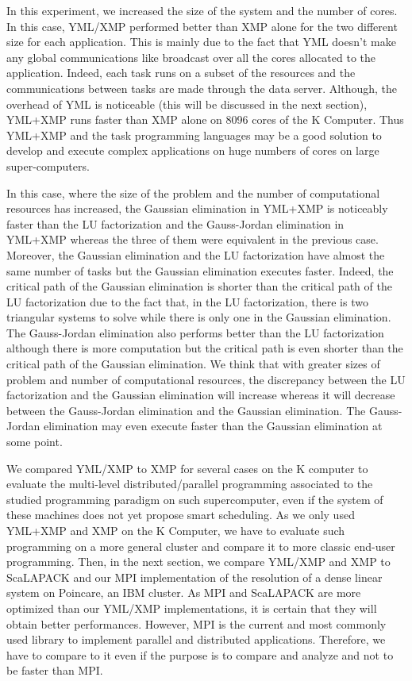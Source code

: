 In this experiment, we increased the size of the system and the number of cores.
In this case, YML/XMP performed better than XMP alone for the two different size for each application.
This is mainly due to the fact that YML doesn't make any global communications like broadcast over all the cores allocated to the application.
Indeed, each task runs on a subset of the resources and the communications between tasks are made through the data server.
Although, the overhead of YML is noticeable (this will be discussed in the next section), YML+XMP runs faster than XMP alone on 8096 cores of the K Computer.
Thus YML+XMP and the task programming languages may be a good solution to develop and execute complex applications on huge numbers of cores on large super-computers.

In this case, where the size of the problem and the number of computational resources has increased, the Gaussian elimination in YML+XMP is noticeably faster than the LU factorization and the Gauss-Jordan elimination in YML+XMP whereas the three of them were equivalent in the previous case.
Moreover, the Gaussian elimination and the LU factorization have almost the same number of tasks but the Gaussian elimination executes faster.
Indeed, the critical path of the Gaussian elimination is shorter than the critical path of the LU factorization due to the fact that, in the LU factorization, there is two triangular systems to solve while there is only one in the Gaussian elimination.
The Gauss-Jordan elimination also performs better than the LU factorization although there is more computation but the critical path is even shorter than the critical path of the Gaussian elimination.
We think that with greater sizes of problem and number of computational resources, the discrepancy between the LU factorization and the Gaussian elimination will increase whereas it will decrease between the Gauss-Jordan elimination and the Gaussian elimination.
The Gauss-Jordan elimination may even execute faster than the Gaussian elimination at some point.


We compared YML/XMP to XMP for several cases on the K computer to evaluate the multi-level distributed/parallel programming associated to the studied programming paradigm on such supercomputer, even if the system of these machines does not yet propose smart scheduling.
As we only used YML+XMP and XMP on the K Computer, we have to evaluate such programming on a more general cluster and compare it to more classic end-user programming.
Then, in the next section, we compare YML/XMP and XMP to ScaLAPACK and our MPI implementation of the resolution of a dense linear system on Poincare, an IBM cluster.
As MPI and ScaLAPACK are more optimized than our YML/XMP implementations, it is certain that they will obtain better performances.
However, MPI is the current and most commonly used library to implement parallel and distributed applications.
Therefore, we have to compare to it even if the purpose is to compare and analyze and not to be faster than MPI.


